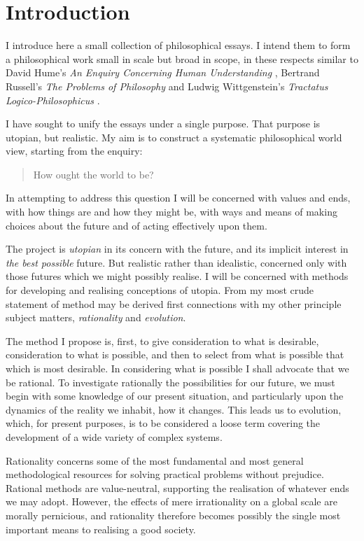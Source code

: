 \chapter{Introduction}\label{Introduction}

I introduce here a small collection of philosophical essays.
I intend them to form a philosophical work small in scale but broad in scope, in these respects similar to David Hume's {\it An Enquiry Concerning Human Understanding} \cite{humeECHU}, Bertrand Russell's {\it The Problems of Philosophy} \cite{russellPP} and Ludwig Wittgenstein's {\it Tractatus Logico-Philosophicus} \cite{wittgenstein1921}.

I have sought to unify the essays under a single purpose.
That purpose is utopian, but realistic.
My aim is to construct a systematic philosophical world view, starting from the enquiry:

\begin{quote}\label{Q1}
How ought the world to be?
\end{quote}

In attempting to address this question I will be concerned with values and ends, with how things are and how they might be, with ways and means of making choices about the future and of acting effectively upon them.

The project is {\it utopian} in its concern with the future, and its implicit interest in {\it the best possible} future.
But realistic rather than idealistic, concerned only with those futures which we might possibly realise.
I will be concerned with methods for developing and realising conceptions of utopia.
From my most crude statement of method may be derived first connections with my other principle subject matters, {\it rationality} and {\it evolution}.

The method I propose is, first, to give consideration to what is desirable, consideration to what is possible, and then to select from what is possible that which is most desirable.
In considering what is possible I shall advocate that we be rational.
To investigate rationally the possibilities for our future, we must begin with some knowledge of our present situation, and particularly upon the dynamics of the reality we inhabit, how it changes.
This leads us to evolution, which, for present purposes, is to be considered a loose term covering the development of a wide variety of complex systems.

Rationality concerns some of the most fundamental and most general methodological resources for solving practical problems without prejudice.
Rational methods are value-neutral, supporting the realisation of whatever ends we may adopt.
However, the effects of mere irrationality on a global scale are morally pernicious, and rationality therefore becomes possibly the single most important means to realising a good society.

